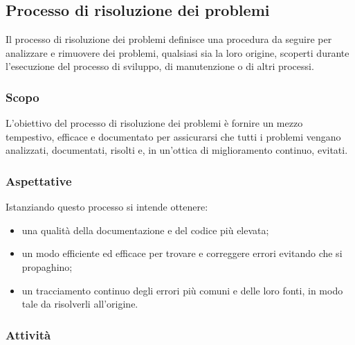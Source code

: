 \subsection{Processo di risoluzione dei problemi}

	Il processo di risoluzione dei problemi definisce una procedura da seguire per analizzare e rimuovere dei problemi, qualsiasi sia la loro origine, scoperti durante l'esecuzione del processo di sviluppo, di manutenzione o di altri processi.

	\subsubsection{Scopo}
		L'obiettivo del processo di risoluzione dei problemi è fornire un mezzo tempestivo, efficace e documentato per assicurarsi che tutti i problemi vengano analizzati, documentati, risolti e, in un'ottica di miglioramento continuo, evitati.

	\subsubsection{Aspettative}
		Istanziando questo processo si intende ottenere:
		\begin{itemize}
		 	\item una qualità della documentazione e del codice più elevata;
		 	\item un modo efficiente ed efficace per trovare e correggere errori evitando che si propaghino;
		 	\item un tracciamento continuo degli errori più comuni e delle loro fonti, in modo tale da risolverli all'origine.
		 \end{itemize}
	\subsubsection{Attività}
